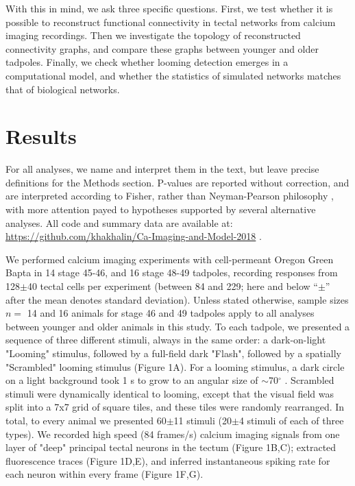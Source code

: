 \documentclass{article}
\begin{document}
With this in mind, we ask three specific questions. First, we test whether it is possible to reconstruct functional connectivity in tectal networks from calcium imaging recordings. Then we investigate the topology of reconstructed connectivity graphs, and compare these graphs between younger and older tadpoles. Finally, we check whether looming detection emerges in a computational model, and whether the statistics of simulated networks matches that of biological networks.

\section*{Results}

For all analyses, we name and interpret them in the text, but leave precise definitions for the Methods section. P-values are reported without correction, and are interpreted according to Fisher, rather than Neyman-Pearson philosophy \citep{greenland2016, amrhein2019pval}, with more attention payed to hypotheses supported by several alternative analyses. All code and summary data are available at:  \url{https://github.com/khakhalin/Ca-Imaging-and-Model-2018} .


We performed calcium imaging experiments with cell-permeant Oregon Green Bapta in 14 stage 45-46, and 16 stage 48-49 tadpoles, recording responses from 128$\pm$40 tectal cells per experiment (between 84 and 229; here and below “$\pm$” after the mean denotes standard deviation). Unless stated otherwise, sample sizes $n=$ 14 and 16 animals for stage 46 and 49 tadpoles apply to all analyses between younger and older animals in this study. To each tadpole, we presented a sequence of three different stimuli, always in the same order: a dark-on-light "Looming" stimulus, followed by a full-field dark "Flash", followed by a spatially "Scrambled" looming stimulus (Figure 1A). For a looming stimulus, a dark circle on a light background took 1 s to grow to an angular size of $\sim$70$^\circ$ \citep{khakhalin2014}. Scrambled stimuli were dynamically identical to looming, except that the visual field was split into a 7x7 grid of square tiles, and these tiles were randomly rearranged. In total, to every animal we presented 60$\pm$11 stimuli (20$\pm$4 stimuli of each of three types). We recorded high speed (84 frames/s) calcium imaging signals \citep{xu2011, truszkowski2017} from one layer of "deep" principal tectal neurons in the tectum (Figure 1B,C); extracted fluorescence traces (Figure 1D,E), and inferred instantaneous spiking rate for each neuron within every frame (Figure 1F,G).
\end{document}
